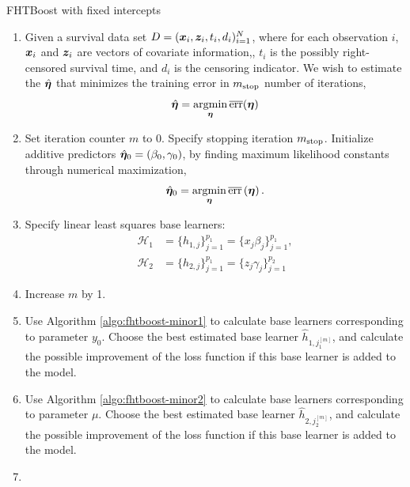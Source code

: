 \begin{algorithm}
\caption{FHTBoost with fixed intercepts}
\label{algo:fhtboost}
\begin{enumerate}
    \item
        Given a survival data set $D=(\bm{x}_i, \bm{z}_i, t_i,d_i)_{i=1}^N$, where for each observation $i$,
        $\bm{x}_i$ and $\bm{z}_i$ are vectors of covariate information,, $t_i$ is the possibly right-censored survival time, and $d_i$ is the censoring indicator.
        We wish to estimate the $\hat{\boldsymbol{\eta}}$ that minimizes the training error in $m_{\text{stop}}$ number of iterations,
        \begin{equation*}
            \hat{\boldsymbol{\eta}}=\operatorname*{argmin}_{\boldsymbol{\eta}}\overline{\text{err}}(\boldsymbol{\eta})
        \end{equation*}
    \item
        Set iteration counter $m$ to $0$.
        Specify stopping iteration $m_{\text{stop}}$.
        Initialize additive predictors $\hat{\boldsymbol{\eta}}_0=\left(\beta_{0},\gamma_{0}\right)$, by finding maximum likelihood constants through numerical maximization,
        \begin{equation*}
            \hat{\boldsymbol{\eta}}_0=\operatorname*{argmin}_{\boldsymbol{\eta}}\overline{\text{err}}\left(\boldsymbol{\eta}\right).
        \end{equation*}
    \item
    \label{algostep:FHT-base-learner}
        Specify linear least squares base learners:
        \begin{align*}
            \mathcal{H}_1&=\{h_{1,j}\}_{j=1}^{p_1}=\{x_j\beta_j\}_{j=1}^{p_1}, \\
            \mathcal{H}_2&=\{h_{2,j}\}_{j=1}^{p_1}=\{z_j\gamma_j\}_{j=1}^{p_2}
        \end{align*}
    \item
    \label{algostep:FHT-init}
        Increase $m$ by 1.
    \item
        Use Algorithm \ref{algo:fhtboost-minor1} to
        calculate base learners corresponding to parameter $y_0$.
        Choose the best estimated base learner $\hat{h}_{1,j_1^{[m]}}$, and calculate the possible improvement of the loss function if this base learner is added to the model.
    \item
        Use Algorithm \ref{algo:fhtboost-minor2} to
        calculate base learners corresponding to parameter $\mu$.
        Choose the best estimated base learner $\hat{h}_{2,j_2^{[m]}}$, and calculate the possible improvement of the loss function if this base learner is added to the model.
    \item

\end{enumerate}
\end{algorithm}
